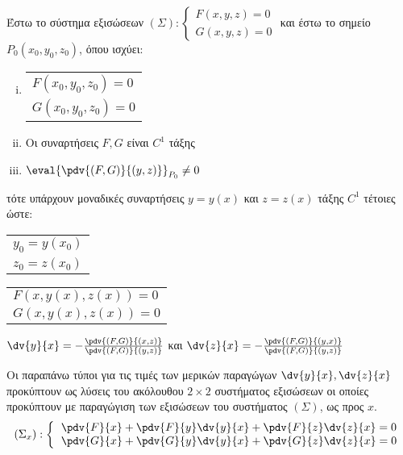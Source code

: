 Έστω το σύστημα εξισώσεων $(\Sigma):
\begin{cases}
  F(x,y,z) = 0  \\
  G(x,y,z) = 0
\end{cases}$
και έστω το σημείο $ P_0(x_0,y_0,z_0) $, όπου ισχύει:
\begin{enumerate}[(i)]
  \item  
    \begin{tabular}{l}
      $F(x_0,y_0,z_0) = 0$ \\
      $G(x_0,y_0,z_0) = 0$
    \end{tabular}
  \item Οι συναρτήσεις $ F, G $ είναι $ C^{1} $ τάξης 
  \item $ \eval{\pdv{(F,G)}{(y,z)}} _{P_{0}} \neq 0 $
\end{enumerate} 
τότε υπάρχουν μοναδικές συναρτήσεις $ y = y(x) $ και $ z = z(x) $ τάξης $ C^{1} $ 
τέτοιες ώστε:
\begin{myitemize}
  \item 
    \begin{tabular}{l}
      $ y_0 = y(x_0) $ \\
      $ z_0 = z(x_0) $
    \end{tabular}
  \item 
    \begin{tabular}{l}
      $ F(x,y(x),z(x)) = 0 $ \\
      $ G(x,y(x),z(x)) = 0 $
    \end{tabular}
  \item $ \dv{y}{x} = - \frac{\pdv{(F,G)}{(x,z)}}{\pdv{(F,G)}{(y,z)}} $ και 
    $ \dv{z}{x} = - \frac{\pdv{(F,G)}{(y,x)}}{\pdv{(F,G)}{(y,z)}} $
\end{myitemize}

\begin{rem}
  Οι παραπάνω τύποι για τις τιμές των μερικών παραγώγων $ \dv{y}{x}, \dv{z}{x}$ 
  προκύπτουν ως λύσεις του ακόλουθου $ 2 \times 2 $ συστήματος εξισώσεων οι οποίες 
  προκύπτουν με παραγώγιση των εξισώσεων του συστήματος $ (\Sigma) $, ως προς $x$.
  \renewcommand{\arraystretch}{2}
  \[
    \begin{aligned}
      (\Sigma_x): \left\{\begin{tabular}{l}
          $\pdv{F}{x} + \pdv{F}{y}\dv{y}{x} + \pdv{F}{z}\dv{z}{x} = 0$ \\
          $\pdv{G}{x} + \pdv{G}{y}\dv{y}{x} + \pdv{G}{z}\dv{z}{x} = 0$
        \end{tabular}
      \right.
    \end{aligned}
  \]
\end{rem}

